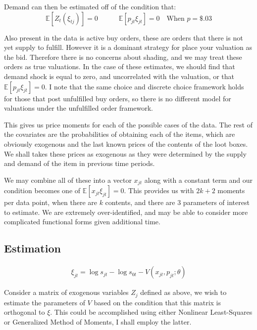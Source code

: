 \documentclass[12pt]{paper}
\newcommand{\exV}[1]{\mathbb{E} \left [ #1 \right ]}
\begin{document}
Demand can then be estimated off of the condition that:
\begin{equation*}
  \exV{Z_t (\xi_{tj})} = 0 \quad \quad \quad \exV{ p_{jt} \xi_{jt} } = 0 \quad \text{When } p = \$.03
\end{equation*}


Also present in the data is active buy orders, these are orders
that there is not yet supply to fulfill. However it is a dominant
strategy for place your valuation as the bid. Therefore there is no
concerns about shading, and we may treat these orders as true
valuations. In the case of these estimates, we should find that demand
shock is equal to zero, and uncorrelated with the valuation, or that
$\exV{p_{jt}\xi_{jt}} = 0$. I note that the same choice and discrete
choice framework holds for those that post unfulfilled buy orders, so
there is no different model for valuations under the unfulfilled order
framework. 

This gives us price moments for each of the possible cases of the
data. The rest of the covariates are the probabilities of obtaining
each of the items, which are obviously exogenous and the last known
prices of the contents of the loot boxes. We shall takes these prices
as exogenous as they were determined by the supply and demand of the
item in previous time periods.

We may combine all of these into a vector $x_{jt}$ along with a
constant term and our condition becomes one of
$\exV{x_{jt}\xi_{jt}} = 0$. This provides us with $2k + 2$ moments per
data point, when there are $k$ contents, and there are $3$
parameters of interest to estimate. We are extremely over-identified,
and may be able to consider more complicated functional forms given
additional time.


\subsection{Estimation}

\begin{align*}
  \xi_{jt} = \log s_{jt} - \log s_{0t} - V( x_{jt}, p_{jt}; \theta)
\end{align*}


Consider a matrix of exogenous variables $Z_j$ defined as above, we wish
to estimate the parameters of $V$ based on the condition that this
matrix is orthogonal to $\xi$. This could be accomplished using either
Nonlinear Least-Squares or Generalized Method of Moments, I shall
employ the latter.
\end{document}
